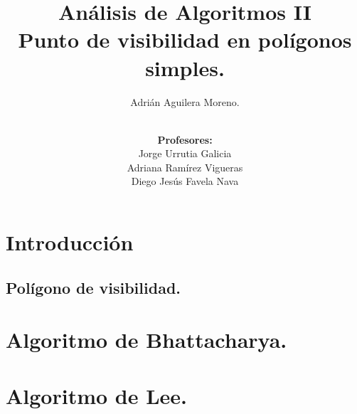 \documentclass{beamer}
\title{\Large {Análisis de Algoritmos II}\\ {\color{mostazaccm} \textbf{Punto de visibilidad en polígonos simples.}}}
\author{Adrián Aguilera Moreno.}
\date{\\\textbf{Profesores:}
  \\ {Jorge Urrutia Galicia}
  \\ {Adriana Ramírez Vigueras}
  \\ {Diego Jesús Favela Nava}}
\institute{aguilera@ciencias.unam.mx}
\begin{document}
{

\begin{frame}
  \titlepage %
\end{frame}

} %

\begin{frame}
\tableofcontents %
\end{frame}

\section{Introducción} %
\subsection{Polígono de visibilidad.}


\section{Algoritmo de Bhattacharya.} %


\section{Algoritmo de Lee.} %

\end{document}
